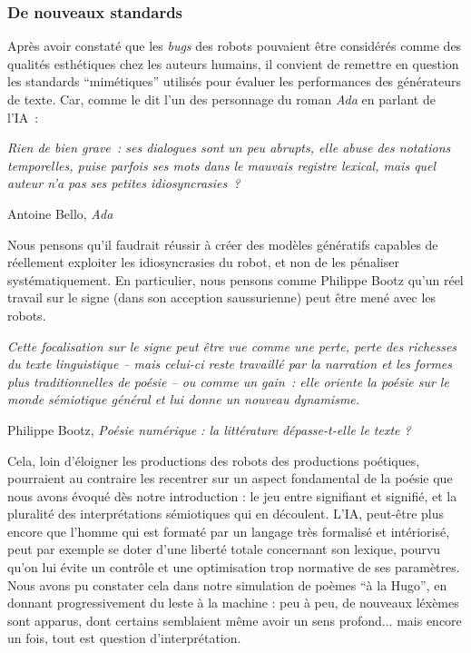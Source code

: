 \documentclass{article}
\newenvironment{citationbox}
{\begin{center}
		\begin{minipage}{.8\textwidth}
		}
		{
		\end{minipage}	
\end{center}
}
\begin{document}
			\subsubsection{De nouveaux standards}
				Après avoir constaté que les \textit{bugs} des robots pouvaient être considérés comme des qualités esthétiques chez les auteurs humains, il convient de remettre en question les standards ``mimétiques'' utilisés pour évaluer les performances des générateurs de texte. Car, comme le dit l'un des personnage du roman \textit{Ada} en parlant de l'IA~:
				\begin{citationbox}
					\textit{Rien de bien grave~: ses dialogues sont un peu abrupts, elle abuse des notations temporelles, puise parfois ses mots dans le mauvais registre lexical, mais quel auteur n'a pas ses petites idiosyncrasies~?}
					\begin{flushright}
						Antoine Bello, \textit{Ada} \cite{bello2016}
					\end{flushright}
				\end{citationbox}
				Nous pensons qu'il faudrait réussir à créer des modèles génératifs capables de réellement exploiter les idiosyncrasies du robot, et non de les pénaliser systématiquement. En particulier, nous pensons comme Philippe Bootz qu'un réel travail sur le signe (dans son acception saussurienne) peut être mené avec les robots.
				\begin{citationbox}
					\textit{Cette focalisation sur le signe peut être vue comme une perte, perte des richesses du
					texte linguistique -- mais celui-ci reste travaillé par la narration et les formes plus
					traditionnelles de poésie -- ou comme un gain~: elle oriente la poésie sur le monde sémiotique
					général et lui donne un nouveau dynamisme. }
					\begin{flushright}
						Philippe Bootz, \textit{Poésie numérique : la littérature dépasse-t-elle le
						texte ?} \cite{bootz2005}
					\end{flushright}
				\end{citationbox}
				Cela, loin d'éloigner les productions des robots des productions poétiques, pourraient au contraire les recentrer sur un aspect fondamental de la poésie que nous avons évoqué dès notre introduction : le jeu entre signifiant et signifié, et la pluralité des interprétations sémiotiques qui en découlent. L'IA, peut-être plus encore que l'homme qui est formaté par un langage très formalisé et intériorisé, peut par exemple se doter d'une liberté totale concernant son lexique, pourvu qu'on lui évite un contrôle et une optimisation trop normative de ses paramètres. Nous avons pu constater cela dans notre simulation de poèmes ``à la Hugo'', en donnant progressivement du leste à la machine : peu à peu, de nouveaux léxèmes sont apparus, dont certains semblaient même avoir un sens profond... mais encore un fois, tout est question d'interprétation.\\
				
\end{document}
